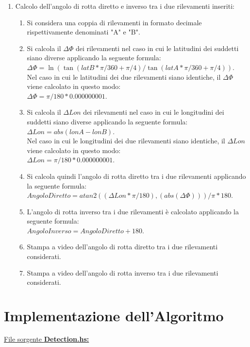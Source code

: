 \documentclass{article}
\begin{document}
\begin{enumerate}
	\item  Calcolo dell'angolo di rotta diretto e inverso tra i due rilevamenti inseriti:
	\begin{enumerate}
		\item  Si considera una coppia di rilevamenti in formato decimale rispettivamente denominati "A" e "B".
		\item Si calcola il $\Delta\Phi$ dei rilevamenti nel caso in cui le latitudini dei suddetti siano diverse applicando la seguente formula:\\ $\Delta\Phi = \ln( \tan(latB * \pi / 360 + \pi / 4 ) / \tan(latA * \pi / 360 + \pi / 4 )). $\\
		Nel caso in cui le latitudini dei due rilevamenti siano identiche, il $\Delta\Phi$ viene calcolato in questo modo:\\ $\Delta\Phi = \pi / 180 * 0.000000001.$
		\item Si calcola il $\Delta Lon$ dei rilevamenti nel caso in cui le longitudini dei suddetti siano diverse applicando la seguente formula:\\ $ \Delta Lon = abs(lonA - lonB). $\\
		Nel caso in cui le longitudini dei due rilevamenti siano identiche, il $\Delta Lon$ viene calcolato in questo modo:\\ $\Delta Lon = \pi / 180 * 0.000000001.$
		\item Si calcola quindi l'angolo di rotta diretto tra i due rilevamenti applicando la seguente formula:\\ $ Angolo Diretto = atan2((\Delta Lon * \pi / 180), (abs(\Delta\Phi))) / \pi * 180.$\\
		\item L'angolo di rotta inverso tra i due rilevamenti è calcolato applicando la seguente formula: \\ $ Angolo Inverso = Angolo Diretto + 180.$\\
		\item Stampa a video dell'angolo di rotta diretto tra i due rilevamenti considerati.
		\item Stampa a video dell'angolo di rotta inverso tra i due rilevamenti considerati.
	\end{enumerate}

\end{enumerate}
\newpage

\section{Implementazione dell'Algoritmo}
\raggedright
\underline{File sorgente \textbf{Detection.hs:}}

\end{document}
